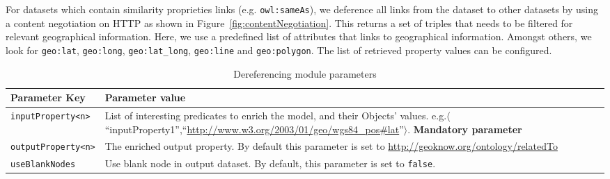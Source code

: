 \documentclass[a4paper,twoside,bibtotoc,abstracton,12pt,BCOR=15mm]{article}
\begin{document}
    For datasets which contain similarity proprieties links (e.g. \texttt{owl:sameAs}), we deference all links from the dataset to other datasets by using a content negotiation on HTTP as shown in Figure~\ref{fig:contentNegotiation}.
    This returns a set of triples that needs to be filtered for relevant geographical information.
    Here, we use a predefined list of attributes that links to geographical information.
    Amongst others, we look for \texttt{geo:lat}, \texttt{geo:long}, \texttt{geo:lat\_long}, \texttt{geo:line} and \texttt{geo:polygon}.
    The list of retrieved property values can be configured.


    \begin{table}
    \caption{Dereferencing module parameters} \label{tbl:derefPram}
    \small
    \begin{tabularx}{\textwidth}{@{}lX@{}}
    \toprule
    \textbf{Parameter Key} 		& \textbf{Parameter value}\\
    \toprule
    \texttt{inputProperty<n>} 	& List of interesting predicates to enrich the model, and their Objects' values. e.g.$\langle$``inputProperty1'',``\url{http://www.w3.org/2003/01/geo/wgs84_pos#lat}''$\rangle$. \textbf{Mandatory parameter}\\
    \midrule
    \texttt{outputProperty<n>} 	& The enriched output property. By default this parameter is set to \url{http://geoknow.org/ontology/relatedTo}\\
    \midrule
    \texttt{useBlankNodes}		& Use blank node in output dataset. By default, this parameter is set to \texttt{false}.\\
    \bottomrule
    \end{tabularx}
    \end{table}
    
\end{document}
